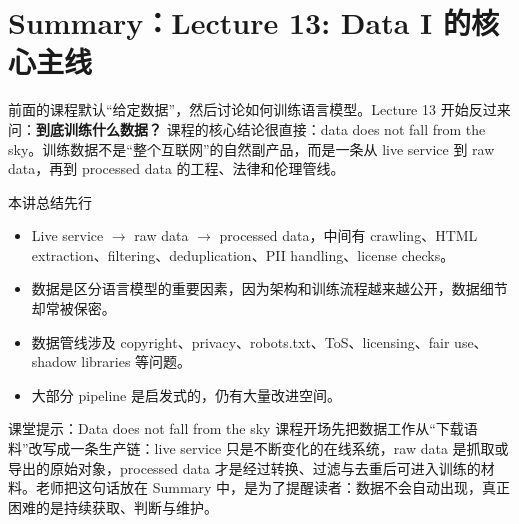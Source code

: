 \section{Summary：Lecture 13: Data I 的核心主线}

前面的课程默认“给定数据”，然后讨论如何训练语言模型。Lecture 13 开始反过来问：\textbf{到底训练什么数据？} 课程的核心结论很直接：data does not fall from the sky。训练数据不是“整个互联网”的自然副产品，而是一条从 live service 到 raw data，再到 processed data 的工程、法律和伦理管线。

\begin{importantbox}{本讲总结先行}
\begin{itemize}
    \item Live service \(\rightarrow\) raw data \(\rightarrow\) processed data，中间有 crawling、HTML extraction、filtering、deduplication、PII handling、license checks。
    \item 数据是区分语言模型的重要因素，因为架构和训练流程越来越公开，数据细节却常被保密。
    \item 数据管线涉及 copyright、privacy、robots.txt、ToS、licensing、fair use、shadow libraries 等问题。
    \item 大部分 pipeline 是启发式的，仍有大量改进空间。
\end{itemize}
\end{importantbox}

\begin{knowledgebox}{课堂提示：Data does not fall from the sky}
课程开场先把数据工作从“下载语料”改写成一条生产链：live service 只是不断变化的在线系统，raw data 是抓取或导出的原始对象，processed data 才是经过转换、过滤与去重后可进入训练的材料。老师把这句话放在 Summary 中，是为了提醒读者：数据不会自动出现，真正困难的是持续获取、判断与维护。
\end{knowledgebox}

